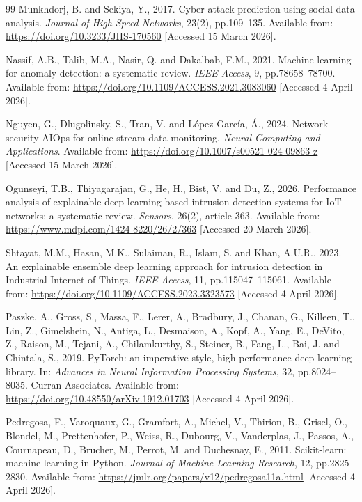 \documentclass[12pt,a4paper]{report}
\begin{document}
\begin{thebibliography}{99}
Munkhdorj, B. and Sekiya, Y., 2017. Cyber attack prediction using social data analysis. \textit{Journal of High Speed Networks}, 23(2), pp.109--135. Available from: \url{https://doi.org/10.3233/JHS-170560} [Accessed 15 March 2026].

Nassif, A.B., Talib, M.A., Nasir, Q. and Dakalbab, F.M., 2021. Machine learning for anomaly detection: a systematic review. \textit{IEEE Access}, 9, pp.78658--78700. Available from: \url{https://doi.org/10.1109/ACCESS.2021.3083060} [Accessed 4 April 2026].

Nguyen, G., Dlugolinsky, S., Tran, V. and L\'{o}pez Garc\'{i}a, \'{A}., 2024. Network security AIOps for online stream data monitoring. \textit{Neural Computing and Applications}. Available from: \url{https://doi.org/10.1007/s00521-024-09863-z} [Accessed 15 March 2026].

Ogunseyi, T.B., Thiyagarajan, G., He, H., Bist, V. and Du, Z., 2026. Performance analysis of explainable deep learning-based intrusion detection systems for IoT networks: a systematic review. \textit{Sensors}, 26(2), article 363. Available from: \url{https://www.mdpi.com/1424-8220/26/2/363} [Accessed 20 March 2026].

Shtayat, M.M., Hasan, M.K., Sulaiman, R., Islam, S. and Khan, A.U.R., 2023. An explainable ensemble deep learning approach for intrusion detection in Industrial Internet of Things. \textit{IEEE Access}, 11, pp.115047--115061. Available from: \url{https://doi.org/10.1109/ACCESS.2023.3323573} [Accessed 4 April 2026].


Paszke, A., Gross, S., Massa, F., Lerer, A., Bradbury, J., Chanan, G., Killeen, T., Lin, Z., Gimelshein, N., Antiga, L., Desmaison, A., Kopf, A., Yang, E., DeVito, Z., Raison, M., Tejani, A., Chilamkurthy, S., Steiner, B., Fang, L., Bai, J. and Chintala, S., 2019. PyTorch: an imperative style, high-performance deep learning library. In: \textit{Advances in Neural Information Processing Systems}, 32, pp.8024--8035. Curran Associates. Available from: \url{https://doi.org/10.48550/arXiv.1912.01703} [Accessed 4 April 2026].

Pedregosa, F., Varoquaux, G., Gramfort, A., Michel, V., Thirion, B., Grisel, O., Blondel, M., Prettenhofer, P., Weiss, R., Dubourg, V., Vanderplas, J., Passos, A., Cournapeau, D., Brucher, M., Perrot, M. and Duchesnay, E., 2011. Scikit-learn: machine learning in Python. \textit{Journal of Machine Learning Research}, 12, pp.2825--2830. Available from: \url{https://jmlr.org/papers/v12/pedregosa11a.html} [Accessed 4 April 2026].


\end{thebibliography}
\end{document}

